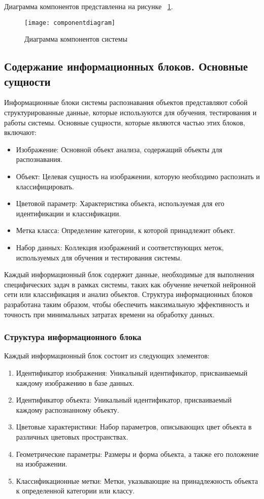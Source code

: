 Диаграмма компонентов представленна на рисунке ~\ref{componentdiagram:image}.

\begin{figure}[ht]
\texttt{[image: componentdiagram]}
\caption{Диаграмма компонентов системы}
\label{componentdiagram:image}
\end{figure}

\subsection{Содержание информационных блоков. Основные сущности}

Информационные блоки системы распознавания объектов представляют собой структурированные данные, которые используются для обучения, тестирования и работы системы. Основные сущности, которые являются частью этих блоков, включают:

\begin{itemize}
\item Изображение: Основной объект анализа, содержащий объекты для распознавания.
\item Объект: Целевая сущность на изображении, которую необходимо распознать и классифицировать.
\item Цветовой параметр: Характеристика объекта, используемая для его идентификации и классификации.
\item Метка класса: Определение категории, к которой принадлежит объект.
\item Набор данных: Коллекция изображений и соответствующих меток, используемых для обучения и тестирования системы.
\end{itemize}

Каждый информационный блок содержит данные, необходимые для выполнения специфических задач в рамках системы, таких как обучение нечеткой нейронной сети или классификация и анализ объектов. Структура информационных блоков разработана таким образом, чтобы обеспечить максимальную эффективность и точность при минимальных затратах времени на обработку данных.

\subsubsection{Структура информационного блока}

Каждый информационный блок состоит из следующих элементов:

\begin{enumerate}
\item Идентификатор изображения: Уникальный идентификатор, присваиваемый каждому изображению в базе данных.
\item Идентификатор объекта: Уникальный идентификатор, присваиваемый каждому распознанному объекту.
\item Цветовые характеристики: Набор параметров, описывающих цвет объекта в различных цветовых пространствах.
\item Геометрические параметры: Размеры и форма объекта, а также его положение на изображении.
\item Классификационные метки: Метки, указывающие на принадлежность объекта к определенной категории или классу.
\end{enumerate}

